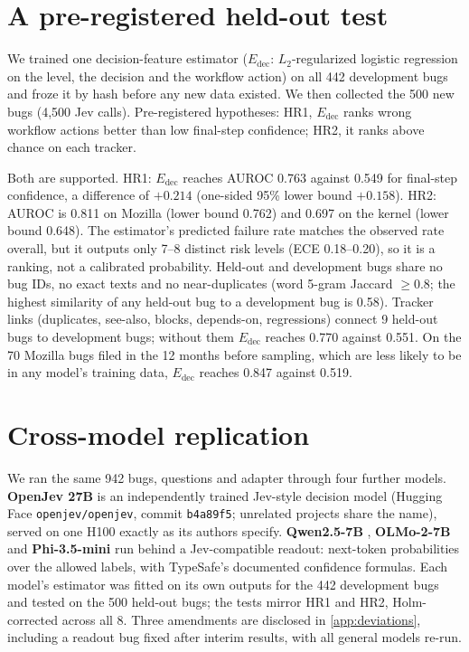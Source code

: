 \section{A pre-registered held-out test}
\label{sec:heldout}

We trained one decision-feature estimator ($E_{\text{dec}}$:
$L_2$-regularized logistic regression on the \score{} level, the \noul{}
decision and the workflow action) on all 442 development bugs and froze it
by hash before any new data existed. We then collected the 500 new bugs
(4{,}500 Jev calls). Pre-registered hypotheses: HR1, $E_{\text{dec}}$ ranks
wrong workflow actions better than low final-step confidence; HR2, it
ranks above chance on each tracker.

Both are supported. HR1: $E_{\text{dec}}$ reaches AUROC 0.763 against 0.549
for final-step confidence, a difference of $+0.214$ (one-sided 95\% lower
bound $+0.158$). HR2: AUROC is 0.811 on Mozilla (lower bound 0.762) and
0.697 on the kernel (lower bound 0.648). The estimator's predicted failure
rate matches the observed rate overall, but it outputs only 7--8 distinct
risk levels (ECE 0.18--0.20), so it is a ranking, not a calibrated
probability. Held-out and development bugs share no bug IDs, no exact
texts and no near-duplicates (word 5-gram Jaccard $\geq 0.8$; the highest
similarity of any held-out bug to a development bug is 0.58). Tracker
links (duplicates, see-also, blocks, depends-on, regressions) connect 9
held-out bugs to development bugs; without them $E_{\text{dec}}$ reaches
0.770 against 0.551. On the 70 Mozilla bugs filed in the 12 months before
sampling, which are less likely to be in any model's training data,
$E_{\text{dec}}$ reaches 0.847 against 0.519.

\section{Cross-model replication}
\label{sec:crossmodel}

We ran the same 942 bugs, questions and adapter through four further
models. \textbf{OpenJev 27B} \citep{openjev2026} is an independently
trained Jev-style decision model (Hugging Face \texttt{openjev/openjev},
commit \texttt{b4a89f5}; unrelated projects share the name), served on
one H100 exactly as its authors specify. \textbf{Qwen2.5-7B}
\citep{qwen2024qwen25}, \textbf{OLMo-2-7B} \citep{olmo2024olmo2} and
\textbf{Phi-3.5-mini} \citep{abdin2024phi3} run behind a Jev-compatible
readout: next-token probabilities over the allowed labels, with
TypeSafe's documented confidence formulas. Each model's estimator was
fitted on its own outputs for the 442 development bugs and tested on the
500 held-out bugs; the tests mirror HR1 and HR2, Holm-corrected across
all 8. Three amendments are disclosed in \cref{app:deviations}, including
a readout bug fixed after interim results, with all general models re-run.

